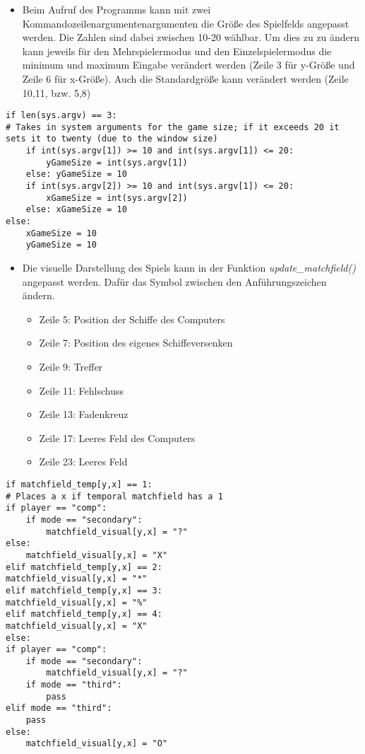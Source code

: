 \documentclass{llncs}
\begin{document}
\begin{itemize}
    \item Beim Aufruf des Programms kann mit zwei Kommandozeilenargumentenargumenten die Größe des Spielfelds angepasst werden. Die Zahlen sind dabei zwischen 10-20 wählbar. Um dies zu zu ändern kann jeweils für den Mehrspielermodus und den Einzelspielermodus die minimum und maximum Eingabe verändert werden (Zeile 3 für y-Größe und Zeile 6 für x-Größe). Auch die Standardgröße kann verändert werden (Zeile 10,11, bzw. 5,8)
\end{itemize}
\lstset{
caption=Annahme der Kommandozeilenargumente}
\begin{lstlisting}
if len(sys.argv) == 3:
# Takes in system arguments for the game size; if it exceeds 20 it sets it to twenty (due to the window size)
    if int(sys.argv[1]) >= 10 and int(sys.argv[1]) <= 20:
        yGameSize = int(sys.argv[1])
    else: yGameSize = 10
    if int(sys.argv[2]) >= 10 and int(sys.argv[1]) <= 20:
        xGameSize = int(sys.argv[2])
    else: xGameSize = 10
else:
    xGameSize = 10
    yGameSize = 10
\end{lstlisting}
\begin{itemize}
    \item Die visuelle Darstellung des Spiels kann in der Funktion \emph{update\_matchfield()} angepasst werden. Dafür das Symbol zwischen den Anführungszeichen ändern. 
    \begin{itemize}
        \item Zeile 5: Position der Schiffe des Computers
        \item Zeile 7: Position des eigenes Schiffeversenken
        \item Zeile 9: Treffer
        \item Zeile 11: Fehlschuss
        \item Zeile 13: Fadenkreuz
        \item Zeile 17: Leeres Feld des Computers
        \item Zeile 23: Leeres Feld
    \end{itemize}
\end{itemize}
\lstset{
caption=Anpassung der visuellen Darstellung}
\begin{lstlisting}
if matchfield_temp[y,x] == 1:
# Places a x if temporal matchfield has a 1
if player == "comp":
    if mode == "secondary":
        matchfield_visual[y,x] = "?"
else:
    matchfield_visual[y,x] = "X" 
elif matchfield_temp[y,x] == 2:
matchfield_visual[y,x] = "*" 
elif matchfield_temp[y,x] == 3:
matchfield_visual[y,x] = "%"  
elif matchfield_temp[y,x] == 4:
matchfield_visual[y,x] = "X"  
else:
if player == "comp":
    if mode == "secondary":
        matchfield_visual[y,x] = "?" 
    if mode == "third":
        pass
elif mode == "third":
    pass
else:
    matchfield_visual[y,x] = "O" 
\end{lstlisting}
\end{document}
